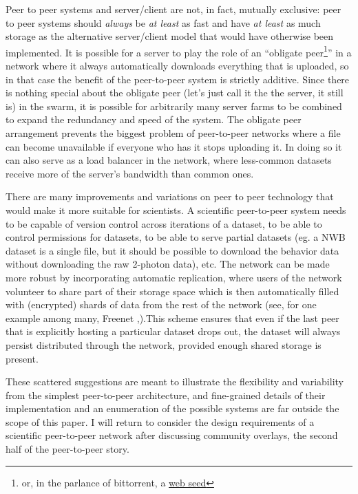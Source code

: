 \documentclass{article}
\begin{document}
Peer to peer systems and server/client are not, in fact, mutually
exclusive: peer to peer systems should \emph{always} be \emph{at least}
as fast and have \emph{at least} as much storage as the alternative
server/client model that would have otherwise been implemented. It is
possible for a server to play the role of an ``obligate
peer\footnote{or, in the parlance of bittorrent, a
  \href{https://en.wikipedia.org/wiki/BitTorrent\#Web_seeding}{web seed}}''
in a network where it always automatically downloads everything that is
uploaded, so in that case the benefit of the peer-to-peer system is
strictly additive. Since there is nothing special about the obligate
peer (let's just call it the the server, it still is) in the swarm, it
is possible for arbitrarily many server farms to be combined to expand
the redundancy and speed of the system. The obligate peer arrangement
prevents the biggest problem of peer-to-peer networks where a file can
become unavailable if everyone who has it stops uploading it. In doing
so it can also serve as a load balancer in the network, where
less-common datasets receive more of the server's bandwidth than common
ones.

There are many improvements and variations on peer to peer technology
that would make it more suitable for scientists. A scientific
peer-to-peer system needs to be capable of version control across
iterations of a dataset, to be able to control permissions for datasets,
to be able to serve partial datasets (eg. a NWB dataset is a single
file, but it should be possible to download the behavior data without
downloading the raw 2-photon data), etc. The network can be made more
robust by incorporating automatic replication, where users of the
network volunteer to share part of their storage space which is then
automatically filled with (encrypted) shards of data from the rest of
the network (see, for one example among many, Freenet \cite{clarkeFreenetDistributedAnonymous2001},).This scheme ensures that
even if the last peer that is explicitly hosting a particular dataset
drops out, the dataset will always persist distributed through the
network, provided enough shared storage is present.

These scattered suggestions are meant to illustrate the flexibility and
variability from the simplest peer-to-peer architecture, and
fine-grained details of their implementation and an enumeration of the
possible systems are far outside the scope of this paper. I will return
to consider the design requirements of a scientific peer-to-peer network
after discussing community overlays, the second half of the peer-to-peer
story.
\end{document}
